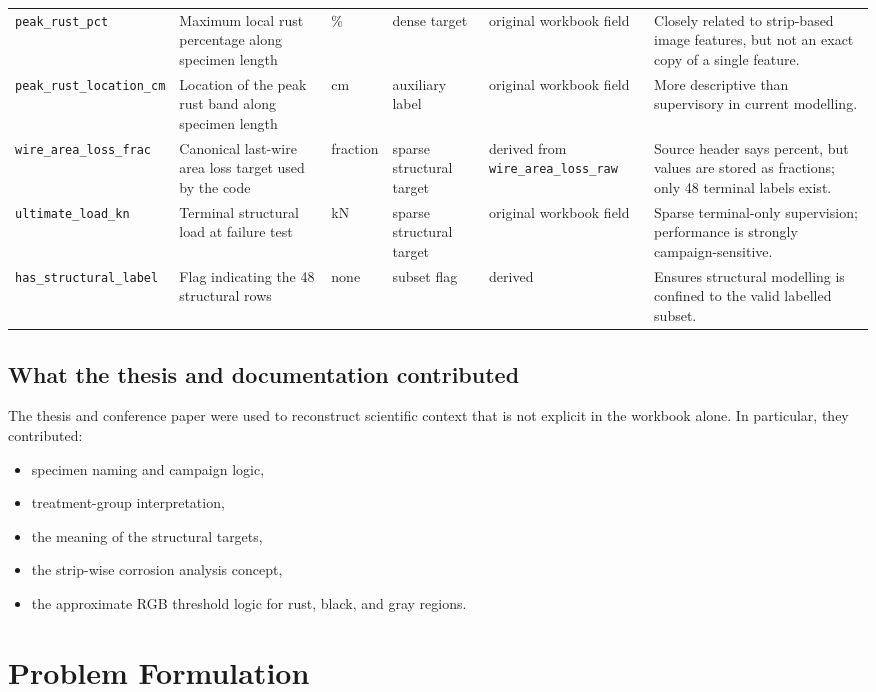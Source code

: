 \documentclass[10pt,a4paper,twocolumn]{article}
\begin{document}
\begin{table}[t]
\begin{tabularx}{\textwidth}{L{0.13\textwidth}L{0.17\textwidth}L{0.07\textwidth}L{0.11\textwidth}L{0.11\textwidth}Y}
\texttt{peak\_rust\_pct} & Maximum local rust percentage along specimen length & \% & dense target & original workbook field & Closely related to strip-based image features, but not an exact copy of a single feature. \\
\texttt{peak\_rust\_location\_cm} & Location of the peak rust band along specimen length & cm & auxiliary label & original workbook field & More descriptive than supervisory in current modelling. \\
\texttt{wire\_area\_loss\_frac} & Canonical last-wire area loss target used by the code & fraction & sparse structural target & derived from \texttt{wire\_area\_loss\_raw} & Source header says percent, but values are stored as fractions; only 48 terminal labels exist. \\
\texttt{ultimate\_load\_kn} & Terminal structural load at failure test & kN & sparse structural target & original workbook field & Sparse terminal-only supervision; performance is strongly campaign-sensitive. \\
\texttt{has\_structural\_label} & Flag indicating the 48 structural rows & none & subset flag & derived & Ensures structural modelling is confined to the valid labelled subset. \\
\bottomrule
\end{tabularx}
\end{table}

\subsection{What the thesis and documentation contributed}

The thesis and conference paper were used to reconstruct scientific context that is not explicit in the workbook alone. In particular, they contributed:

\begin{itemize}
    \item specimen naming and campaign logic,
    \item treatment-group interpretation,
    \item the meaning of the structural targets,
    \item the strip-wise corrosion analysis concept,
    \item the approximate RGB threshold logic for rust, black, and gray regions.
\end{itemize}

\section{Problem Formulation}
\end{document}

